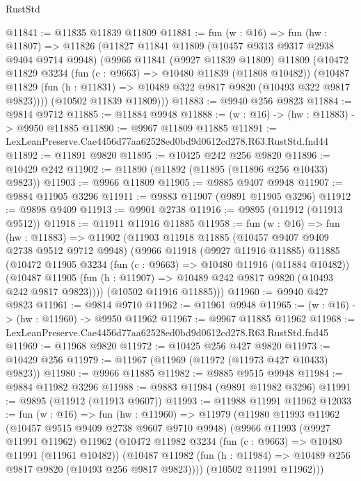 \begin{lexlean}{RustStd}
\begin{coremodule}
@11841 := @11835 @11839 @11809
@11881 := fun (w : @16) =>
  fun (hw : @11807) =>
  @11826
    (@11827
      @11841
      @11809
      (@10457 @9313 @9317 @2938 @9404 @9714 @9948)
      (@9966
        @11841
        (@9927 @11839 @11809)
        @11809
        (@10472
          @11829
          @3234
          (fun (c : @9663) => @10480 @11839 (@11808 @10482))
          (@10487 @11829 (fun (h : @11831) => @10489 @322 @9817 @9820 (@10493 @322 @9817 @9823))))
        (@10502 @11839 @11809)))
@11883 := @9940 @256 @9823
@11884 := @9814 @9712
@11885 := @11884 @9948
@11888 := (w : @16) -> (hw : @11883) -> @9950 @11885
@11890 := @9967 @11809 @11885
@11891 := LexLeanPreserve.Cae4456d77aa62528ed0bd9d0612cd278.R63.RustStd.fnd44
@11892 := @11891 @9820
@11895 := @10425 @242 @256 @9820
@11896 := @10429 @242
@11902 := @11890 (@11892 (@11895 (@11896 @256 @10433) @9823))
@11903 := @9966 @11809
@11905 := @9885 @9407 @9948
@11907 := @9884 @11905 @3296
@11911 := @9883 @11907 (@9891 @11905 @3296)
@11912 := @9898 @9409
@11913 := @9901 @2738
@11916 := @9895 (@11912 (@11913 @9512))
@11918 := @11911 @11916 @11885
@11958 := fun (w : @16) =>
  fun (hw : @11883) =>
  @11902
    (@11903
      @11918
      @11885
      (@10457 @9407 @9409 @2738 @9512 @9712 @9948)
      (@9966
        @11918
        (@9927 @11916 @11885)
        @11885
        (@10472
          @11905
          @3234
          (fun (c : @9663) => @10480 @11916 (@11884 @10482))
          (@10487 @11905 (fun (h : @11907) => @10489 @242 @9817 @9820 (@10493 @242 @9817 @9823))))
        (@10502 @11916 @11885)))
@11960 := @9940 @427 @9823
@11961 := @9814 @9710
@11962 := @11961 @9948
@11965 := (w : @16) -> (hw : @11960) -> @9950 @11962
@11967 := @9967 @11885 @11962
@11968 := LexLeanPreserve.Cae4456d77aa62528ed0bd9d0612cd278.R63.RustStd.fnd45
@11969 := @11968 @9820
@11972 := @10425 @256 @427 @9820
@11973 := @10429 @256
@11979 := @11967 (@11969 (@11972 (@11973 @427 @10433) @9823))
@11980 := @9966 @11885
@11982 := @9885 @9515 @9948
@11984 := @9884 @11982 @3296
@11988 := @9883 @11984 (@9891 @11982 @3296)
@11991 := @9895 (@11912 (@11913 @9607))
@11993 := @11988 @11991 @11962
@12033 := fun (w : @16) =>
  fun (hw : @11960) =>
  @11979
    (@11980
      @11993
      @11962
      (@10457 @9515 @9409 @2738 @9607 @9710 @9948)
      (@9966
        @11993
        (@9927 @11991 @11962)
        @11962
        (@10472
          @11982
          @3234
          (fun (c : @9663) => @10480 @11991 (@11961 @10482))
          (@10487 @11982 (fun (h : @11984) => @10489 @256 @9817 @9820 (@10493 @256 @9817 @9823))))
        (@10502 @11991 @11962)))

\end{coremodule}
\end{lexlean}
